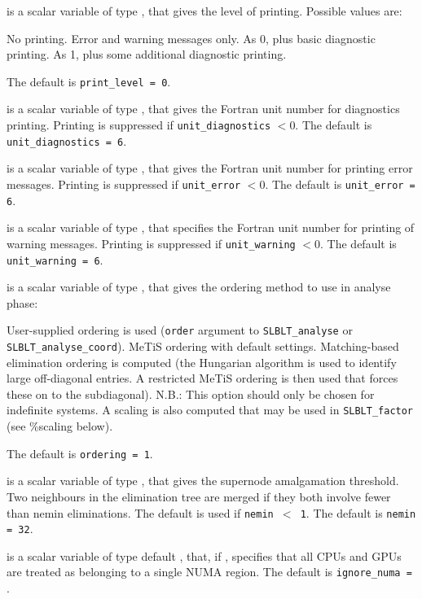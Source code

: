 \documentclass{galahad}
\newcommand{\packagename}{SLBLT}
\begin{document}
\begin{description}

is a scalar variable of type \integer,
that gives the level of printing. Possible values are:
\begin{description}
 No printing.
 Error and warning messages only.
 As 0, plus basic diagnostic printing.
 As 1, plus some additional diagnostic printing.
\end{description}
The default is {\tt print\_level = 0}.

is a scalar variable of type \integer,
that gives the Fortran unit number for diagnostics printing. 
Printing is suppressed if {\tt unit\_diagnostics} $<$0.
The default is {\tt unit\_diagnostics = 6}.

is a scalar variable of type \integer,
that gives the Fortran unit number for printing
error messages. Printing is suppressed if {\tt unit\_error} $<$0.
The default is {\tt unit\_error = 6}.

is a scalar variable of type \integer,
that specifies the  Fortran unit number for printing of
warning messages. Printing is suppressed if {\tt unit\_warning} $<$0.
The default is {\tt unit\_warning = 6}.

is a scalar variable of type \integer,
that gives the ordering method to use in analyse phase:
\begin{description}
 User-supplied ordering is used ({\tt order} argument to
{\tt \packagename\_analyse} or {\tt \packagename\_analyse\_coord}).
 MeTiS ordering with default settings.
 Matching-based elimination ordering is computed (the
Hungarian algorithm is used to identify large
off-diagonal entries. A restricted MeTiS ordering is
then used that forces these on to the subdiagonal).
N.B.: This option should only be chosen for
indefinite systems. A scaling is also computed that may
be used in {\tt \packagename\_factor} (see \%scaling below).
\end{description}
The default is {\tt ordering = 1}.

is a scalar variable of type \integer, that gives the
supernode amalgamation threshold. Two
neighbours in the elimination tree are merged if they both involve fewer
than nemin eliminations. The default is used if {\tt nemin $<$ 1}.
The default is {\tt nemin = 32}.

is a scalar variable of type default \logical, that, if \true, specifies 
that all CPUs and GPUs are treated as belonging to a single NUMA region.
The default is {\tt ignore\_numa = \true}.


\end{description}
\end{document}

